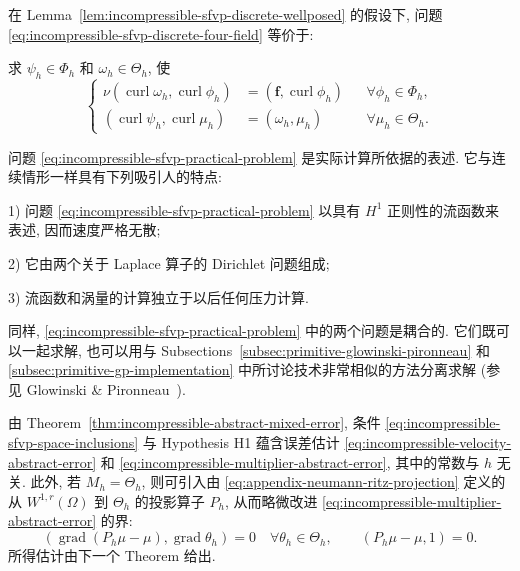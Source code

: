 \begin{Theorem}\label{thm:incompressible-sfvp-practical-equivalence}
在 Lemma~\ref{lem:incompressible-sfvp-discrete-wellposed} 的假设下,
问题 \eqref{eq:incompressible-sfvp-discrete-four-field} 等价于:

求 $\psi_h\in\Phi_h$ 和 $\omega_h\in\Theta_h$, 使
\begin{equation}\label{eq:incompressible-sfvp-practical-problem}
\left\{
\begin{aligned}
\nu(\operatorname{curl}\omega_h,\operatorname{curl}\phi_h)
&=(\mathbf f,\operatorname{curl}\phi_h)
&&\forall\phi_h\in\Phi_h,\\
(\operatorname{curl}\psi_h,\operatorname{curl}\mu_h)
&=(\omega_h,\mu_h)
&&\forall\mu_h\in\Theta_h.
\end{aligned}
\right.
\end{equation}
\end{Theorem}

问题 \eqref{eq:incompressible-sfvp-practical-problem}
是实际计算所依据的表述. 它与连续情形一样具有下列吸引人的特点:

\textup{1)} 问题 \eqref{eq:incompressible-sfvp-practical-problem}
以具有 $H^1$ 正则性的流函数来表述, 因而速度严格无散;

\textup{2)} 它由两个关于 Laplace 算子的 Dirichlet 问题组成;

\textup{3)} 流函数和涡量的计算独立于以后任何压力计算.

同样, \eqref{eq:incompressible-sfvp-practical-problem}
中的两个问题是耦合的. 它们既可以一起求解,
也可以用与 Subsections~\ref{subsec:primitive-glowinski-pironneau}
和 \ref{subsec:primitive-gp-implementation} 中所讨论技术非常相似的方法分离求解
(参见 Glowinski \& Pironneau~\cite{ref:glowinski-pironneau-39}).

由 Theorem~\ref{thm:incompressible-abstract-mixed-error},
条件 \eqref{eq:incompressible-sfvp-space-inclusions} 与 Hypothesis H1
蕴含误差估计
\eqref{eq:incompressible-velocity-abstract-error} 和
\eqref{eq:incompressible-multiplier-abstract-error},
其中的常数与 $h$ 无关.
此外, 若 $M_h=\Theta_h$,
则可引入由 \eqref{eq:appendix-neumann-ritz-projection}
定义的从 $W^{1,r}(\Omega)$ 到 $\Theta_h$ 的投影算子 $P_h$,
从而略微改进 \eqref{eq:incompressible-multiplier-abstract-error} 的界:
\[
(\operatorname{grad}(P_h\mu-\mu),\operatorname{grad}\theta_h)=0
\quad\forall\theta_h\in\Theta_h,
\qquad
(P_h\mu-\mu,1)=0.
\]
所得估计由下一个 Theorem 给出.


